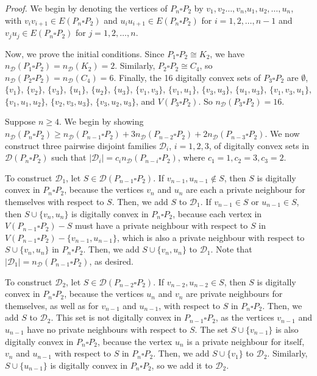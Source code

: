 \documentclass[12pt]{article}
\begin{document}
\noindent
\emph{Proof.} We begin by denoting the vertices of $P_n\square P_2$ by $v_1,v_2\dots,v_n$,$u_1,u_2,\dots,u_n$, with $v_iv_{i+1}\in E(P_n\square P_2)$ and $u_iu_{i+1}\in E(P_n\square P_2)$ for $i=1,2,\dots,n-1$ and $v_ju_j\in E(P_n\square P_2)$ for $j=1,2,\dots,n$. 

Now, we prove the initial conditions. Since $P_1\square P_2 \cong K_2$, we have $n_\mathscr{D}(P_1\square P_2) = n_\mathscr{D}(K_2) = 2$. Similarly, $P_2\square P_2 \cong C_4$, so $n_\mathscr{D}(P_2\square P_2) = n_\mathscr{D}(C_4) = 6$. Finally, the 16 digitally convex sets of $P_3 \square P_2$ are $\emptyset$, $\{v_1\}$, $\{v_2\}$, $\{v_3\}$, $\{u_1\}$, $\{u_2\}$, $\{u_3\}$, $\{v_1,v_3\}$, $\{v_1,u_1\}$, $\{v_3,u_3\}$, $\{u_1,u_3\}$, $\{v_1, v_3,u_1\}$, $\{v_1,u_1,u_2\}$, $\{v_2,v_3,u_3\}$, $\{v_3,u_2,u_3\}$, and $V(P_3\square P_2)$. So $n_\mathscr{D}(P_3\square P_2)=16$.

Suppose $n\geq 4$. We begin by showing $n_\mathscr{D}(P_n\square P_2) \geq n_\mathscr{D}(P_{n-1}\square P_2)+3n_\mathscr{D}(P_{n-2}\square P_2)+2n_\mathscr{D}(P_{n-3}\square P_2)$. We now construct three pairwise disjoint families $\mathscr{D}_i$, $i=1,2,3$, of digitally convex sets in $\mathscr{D}(P_n\square P_2)$ such that $|\mathscr{D}_i| = c_in_\mathscr{D}(P_{n-i}\square P_2)$, where $c_1=1,c_2=3,c_3=2$. 

To construct $\mathscr{D}_1$, let $S\in \mathscr{D}(P_{n-1} \square P_2)$. If $v_{n-1}, u_{n-1}\not\in S$, then $S$ is digitally convex in $P_n \square P_2$, because the vertices $v_n$ and $u_n$ are each a private neighbour for themselves with respect to $S$. Then, we add $S$ to $\mathscr{D}_1$. If $v_{n-1}\in S$ or $u_{n-1}\in S$, then $S\cup\{v_n,u_n\}$ is digitally convex in $P_n \square P_2$, because each vertex in $V(P_{n-1}\square P_2)-S$ must have a private neighbour with respect to $S$ in $V(P_{n-1}\square P_2)-\{v_{n-1},u_{n-1}\}$, which is also a private neighbour with respect to $S\cup\{v_n,u_n\}$ in $P_n\square P_2$. Then, we add $S\cup\{v_n,u_n\}$ to $\mathscr{D}_1$. Note that $|\mathscr{D}_1| = n_\mathscr{D}(P_{n-1}\square P_2)$, as desired. 

To construct $\mathscr{D}_2$, let $S\in \mathscr{D}(P_{n-2}\square P_2)$. If $v_{n-2}, u_{n-2}\in S$, then $S$ is digitally convex in $P_n\square P_2$, because the vertices $u_n$ and $v_n$ are private neighbours for themselves, as well as for $v_{n-1}$ and $u_{n-1}$, with respect to $S$ in $P_n\square P_2$. Then, we add $S$ to $\mathscr{D}_2$. This set is not digitally convex in $P_{n-1}\square P_2$, as the vertices $v_{n-1}$ and $u_{n-1}$ have no private neighbours with respect to $S$. The set $S\cup\{v_{n-1}\}$ is also digitally convex in $P_n\square P_2$, because the vertex $u_n$ is a private neighbour for itself, $v_n$ and $u_{n-1}$ with respect to $S$ in $P_n\square P_2$. Then, we add $S\cup\{v_1\}$ to $\mathscr{D}_2$. Similarly, $S\cup\{u_{n-1}\}$ is digitally convex in $P_n\square P_2$, so we add it to $\mathscr{D}_2$. 
\end{document}
